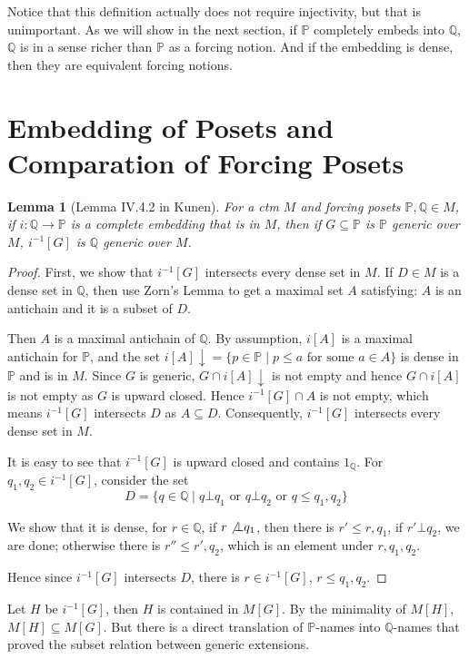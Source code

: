 \documentclass{article}
\newtheorem{lemma}{Lemma}
\newcommand{\bbP}{\mathbb{P}}
\newcommand{\bbQ}{\mathbb{Q}}
\begin{document}
Notice that this definition actually does not require injectivity, but that is unimportant. As we will show in the next section, if $\mathbb{P}$ completely embeds into $\mathbb{Q}$, $\bbQ$ is in a sense richer than $\bbP$ as a forcing notion. And if the embedding is dense, then they are equivalent forcing notions.

\section{Embedding of Posets and Comparation of Forcing Posets}

\begin{lemma}[Lemma IV.4.2 in Kunen]\label{lem:1}
    For a ctm $M$ and forcing posets $\bbP,\bbQ\in M$, if $i:\bbQ\to \bbP$ is a complete embedding that is in $M$, then if $G\subseteq \bbP$ is $\bbP$ generic over $M$, $i^{-1}[G]$ is $\bbQ$ generic over $M$.
\end{lemma}

\begin{proof}
    First, we show that $i^{-1}[G]$ intersects every dense set in $M$. If $D\in M$ is a dense set in $\bbQ$, then use Zorn's Lemma to get a maximal set $A$ satisfying: $A$ is an antichain and it is a subset of $D$.

    Then $A$ is a maximal antichain of $\bbQ$. By assumption, $i[A]$ is a maximal antichain for $\bbP$, and the set $i[A]\downarrow = \{p\in \bbP\mid p\leq a\text{ for some } a\in A\}$ is dense in $\bbP$ and is in $M$. Since $G$ is generic, $G\cap i[A]\downarrow$ is not empty and hence $G\cap i[A]$ is not empty as $G$ is upward closed. Hence $i^{-1}[G]\cap A$ is not empty, which means $i^{-1}[G]$ intersects $D$ as $A\subseteq D$. Consequently, $i^{-1}[G]$ intersects every dense set in $M$.

    It is easy to see that $i^{-1}[G]$ is upward closed and contains $1_{\bbQ}$. For $q_1,q_2\in i^{-1}[G]$, consider the set $$D = \{q\in \bbQ\mid q\bot q_1\text{ or }q\bot q_2\text{ or }q\leq q_1,q_2\}$$

    We show that it is dense, for $r\in \bbQ$, if $r\not \bot q_1$, then there is $r'\leq r,q_1$, if $r'\bot q_2$, we are done; otherwise there is $r''\leq r',q_2$, which is an element under $r,q_1,q_2$.
    
    Hence since $i^{-1}[G]$ intersects $D$, there is $r\in i^{-1}[G]$, $r\leq q_1,q_2$.
\end{proof}


Let $H$ be $i^{-1}[G]$, then $H$ is contained in $M[G]$. By the minimality of $M[H]$, $M[H]\subseteq M[G]$. But there is a direct translation of $\mathbb{P}$-names into $\bbQ$-names that proved the subset relation between generic extensions.
\end{document}

